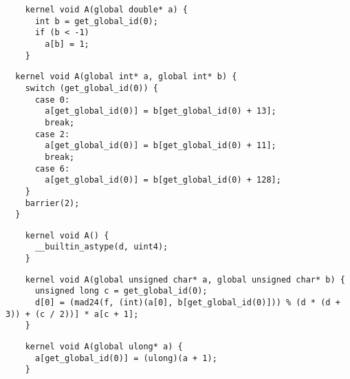 
\newsavebox{\IntelSizetIntReduced}
\begin{lrbox}{\IntelSizetIntReduced}
  \hspace{1.5em}
  \begin{lstlisting}
    kernel void A(global double* a) {
      int b = get_global_id(0);
      if (b < -1)
        a[b] = 1;
    }
  \end{lstlisting}
\end{lrbox}

\newsavebox{\OclgrindRaceSwitch}
\begin{lrbox}{\OclgrindRaceSwitch}
  \hspace{1.5em}
  \begin{lstlisting}
  kernel void A(global int* a, global int* b) {
    switch (get_global_id(0)) {
      case 0:
        a[get_global_id(0)] = b[get_global_id(0) + 13];
        break;
      case 2:
        a[get_global_id(0)] = b[get_global_id(0) + 11];
        break;
      case 6:
        a[get_global_id(0)] = b[get_global_id(0) + 128];
    }
    barrier(2);
  }
  \end{lstlisting}
\end{lrbox}

\newsavebox{\AlmostEverythingCrash}
\begin{lrbox}{\AlmostEverythingCrash}
  \hspace{1.5em}
  \begin{lstlisting}
    kernel void A() {
      __builtin_astype(d, uint4);
    }
  \end{lstlisting}
\end{lrbox}

\newsavebox{\OclgrindSemaAssertion}
\begin{lrbox}{\OclgrindSemaAssertion}
  \hspace{1.5em}
  \begin{lstlisting}
    kernel void A(global unsigned char* a, global unsigned char* b) {
      unsigned long c = get_global_id(0);
      d[0] = (mad24(f, (int)(a[0], b[get_global_id(0)])) % (d * (d + 3)) + (c / 2))] * a[c + 1];
    }
  \end{lstlisting}
\end{lrbox}

\newsavebox{\IntelPtrCompilerHang}
\begin{lrbox}{\IntelPtrCompilerHang}
  \hspace{1.5em}
  \begin{lstlisting}
    kernel void A(global ulong* a) {
      a[get_global_id(0)] = (ulong)(a + 1);
    }
  \end{lstlisting}
\end{lrbox}

